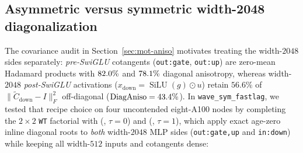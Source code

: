 \subsection{Asymmetric versus symmetric width-2048 diagonalization}
\label{sec:sym-ablation}

The covariance audit in Section~\ref{sec:mot-aniso} motivates treating the
width-$2048$ sides separately: \emph{pre-SwiGLU} cotangents (\texttt{out:gate},
\texttt{out:up}) are zero-mean Hadamard products with
$82.0\%$ and $78.1\%$ diagonal
anisotropy, whereas width-$2048$ \emph{post-SwiGLU} activations
($x_{\text{down}} = \operatorname{SiLU}(g)\odot u$) retain $56.6\%$ of
$\|\tilde C_{\text{down}} - I\|_F^2$ off-diagonal ($\mathrm{DiagAniso} =
43.4\%$). In \texttt{wave\_sym\_fastlag}, we tested that
recipe choice on four uncontended eight-A100 nodes by completing the
$2\times 2$ \texttt{WT} factorial with  (\symmlpdiag{}, $\tau=0$)
and  (\symmlpdiaglag{}, $\tau=1$), which apply exact age-zero
inline diagonal roots to \emph{both} width-$2048$ MLP sides (\texttt{out:gate,up}
and \texttt{in:down}) while keeping all width-$512$ inputs and cotangents dense:

